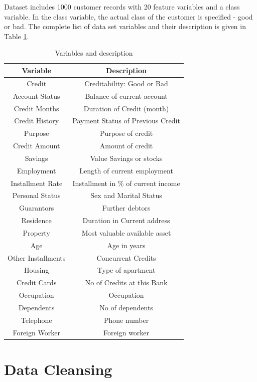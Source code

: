 \documentclass[sigconf]{acmart}
\begin{document}
Dataset includes 1000 customer records with 20 feature variables and a class variable. In the class variable, the actual class of the customer is specified - good or bad. The complete list of data set variables and their description is given in Table \ref{tab:table1}. 

\begin{table}
  \caption{Variables and description
  \cite{psu-site}}
  \label{tab:table1}
  \begin{tabular}{cc}
    \toprule
     Variable& Description\\
    \midrule
    Credit& Creditability: Good or Bad\\
    Account Status& Balance of current account\\
    Credit Months& Duration of Credit (month)\\
    Credit History& Payment Status of Previous Credit\\
    Purpose& Purpose of credit\\
    Credit Amount& Amount of credit\\
    Savings& Value Savings or stocks\\
    Employment& Length of current employment\\
    Installment Rate& Installment in \% of current income\\
    Personal Status& Sex and Marital Status\\
    Guarantors& Further debtors\\
    Residence& Duration in Current address\\
    Property& Most valuable available asset\\
    Age& Age in years\\
    Other Installments& Concurrent Credits\\
    Housing& Type of apartment\\
    Credit Cards& No of Credits at this Bank\\
    Occupation& Occupation\\
    Dependents& No of dependents\\
    Telephone& Phone number\\
    Foreign Worker& Foreign worker\\
    \bottomrule
  \end{tabular}
\end{table}


\section{Data Cleansing}
\end{document}
